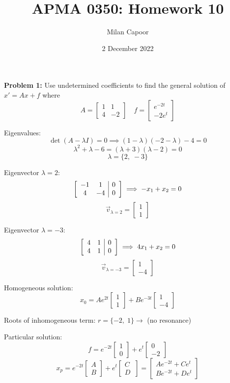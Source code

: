 \documentclass[12pt]{article}
\title{APMA 0350: Homework 10}
\author{Milan Capoor}
\date{2 December 2022}
\begin{document}
\maketitle
\textbf{Problem 1:} Use undetermined coefficients to find the general solution of $x' = Ax + f$ where 
\[A = \begin{bmatrix}
    1 & 1\\
    4 & -2
\end{bmatrix} \quad f = \begin{bmatrix}
    e^{-2t}\\
    -2e^t
\end{bmatrix}\]

Eigenvalues: 
\[\det (A - \lambda I) = 0 \implies (1 - \lambda)(-2 - \lambda) - 4 = 0\]
\[\lambda^2 + \lambda - 6 = (\lambda + 3)(\lambda - 2) = 0\]
\[\lambda = \{2, \; -3\}\]

Eigenvector $\lambda = 2$:
\[\left[\begin{array}{c c | c}
    -1 & 1 & 0\\
    4 & -4 & 0
\end{array}\right] \implies -x_1 + x_2 = 0\]
\[\vec{v}_{\lambda = 2} = \begin{bmatrix}
    1\\1
\end{bmatrix}\]

Eigenvector $\lambda = -3$:
\[\left[\begin{array}{c c | c}
    4 & 1 & 0\\
    4 & 1 & 0
\end{array}\right] \implies 4x_1 + x_2 = 0\]
\[\vec{v}_{\lambda = -3} = \begin{bmatrix}
    1\\-4
\end{bmatrix}\]

Homogeneous solution:
\[x_0 = Ae^{2t} \begin{bmatrix}
    1\\1
\end{bmatrix} + Be^{-3t} \begin{bmatrix}
    1\\-4
\end{bmatrix}\]

Roots of inhomogeneous term: $r = \{-2, \; 1\} \longrightarrow$ (no resonance)

Particular solution:
\[f = e^{-2t} \begin{bmatrix}
    1\\0
\end{bmatrix} + e^t \begin{bmatrix}
    0\\-2
\end{bmatrix}\]
\[x_p = e^{-2t} \begin{bmatrix}
    A\\B
\end{bmatrix} + e^t \begin{bmatrix}
    C\\D\
\end{bmatrix} = \begin{bmatrix}
    Ae^{-2t} + Ce^t\\
    Be^{-2t} + De^t
\end{bmatrix}\]
\end{document}
